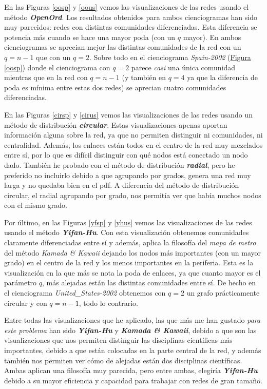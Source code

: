 \documentclass[10pt,a4paper,spanish]{article}
\numberwithin{equation}{section} %
\numberwithin{figure}{section} %
\numberwithin{table}{section} %
\begin{document}
En las Figuras \hyperref[oosp]{\ref*{oosp}} y \hyperref[oous]{\ref*{oous}} vemos las visualizaciones de las redes usando el método \textit{\textbf{OpenOrd}}. Los resultados obtenidos para ambos cienciogramas han sido muy parecidos: redes con distintas comunidades diferenciadas. Esta diferencia se potencia más cuando se hace una mayor poda (con un $q$ mayor). En ambos cienciogramas se aprecian mejor las distintas comunidades de la red con un $q = n-1$ que con un $q = 2$. Sobre todo en el cienciograma \textit{Spain-2002} (\hyperref[oosp]{Figura \ref*{oosp}}) donde el cienciograma con $q=2$ parece \textit{casi} una única comunidad mientras que en la red con $q = n-1$ (y también en $q = 4$ ya que la diferencia de poda es mínima entre estas dos redes) se aprecian cuatro comunidades diferenciadas.

En las Figuras \hyperref[cirsp]{\ref*{cirsp}} y \hyperref[cirus]{\ref*{cirus}} vemos las visualizaciones de las redes usando un método de distribución \textit{\textbf{circular}}. Estas visualizaciones apenas aportan información alguna sobre la red, ya que no permiten distinguir ni comunidades, ni centralidad. Además, los enlaces están todos en el centro de la red muy mezclados entre sí, por lo que es difícil distinguir con qué nodos está conectado un nodo dado. También he probado con el método de distribución \textit{\textbf{radial}}, pero he preferido no incluirlo debido a que agrupando por grados, genera una red muy larga y no quedaba bien en el pdf. A diferencia del método de distribución circular, el radial agrupando por grado, nos permitía ver que había muchos nodos con el mismo grado.

Por último, en las Figuras \hyperref[yfsp]{\ref*{yfsp}} y \hyperref[yhus]{\ref*{yhus}} vemos las visualizaciones de las redes usando el método \textit{\textbf{Yifan-Hu}}. Con esta visualización obtenemos comunidades claramente diferenciadas entre sí y además, aplica la filosofía del \textit{mapa de metro} del método \textit{Kamada \& Kawaii} dejando los nodos más importantes (con un mayor grado) en el centro de la red y los menos importantes en la periferia. Esta es la visualización en la que más se nota la poda de enlaces, ya que cuanto mayor es el parámetro $q$, más alejadas están las distintas comunidades entre sí. De hecho en el cienciograma \textit{United\_States-2002} obtenemos con $q = 2$ un grafo prácticamente circular y con $q = n-1$, todo lo contrario.

Entre todas las visualizaciones que he aplicado, las que más me han gustado \textit{para este problema} han sido \textbf{\textit{Yifan-Hu}} y \textit{\textbf{Kamada \& Kawaii}}, debido a que son las visualizaciones que nos permiten distinguir las disciplinas científicas más importantes, debido a que están colocadas en la parte central de la red, y además también nos permiten ver cómo de alejadas están dos disciplinas científicas. Ambas aplican una filosofía muy parecida, pero entre ambas, elegiría \textit{\textbf{Yifan-Hu}} debido a su mayor eficiencia y capacidad para trabajar con redes de gran tamaño.
\end{document}
